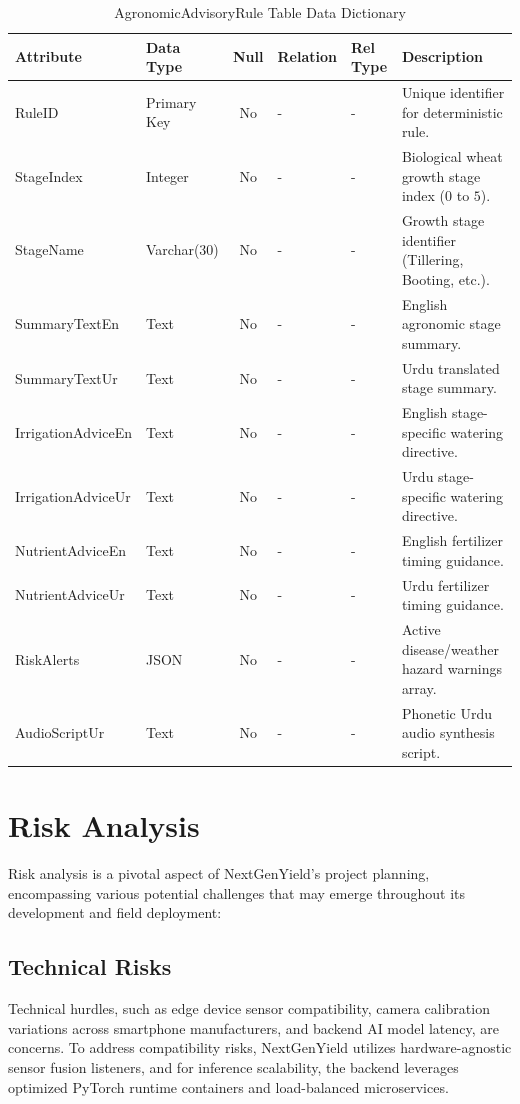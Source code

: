 \begin{table}[H]
\footnotesize
\centering
\caption{AgronomicAdvisoryRule Table Data Dictionary}
\label{tab:advisory_table}
\begin{tabular}{|l|l|c|l|l|p{4.5cm}|}
\hline
\textbf{Attribute} & \textbf{Data Type} & \textbf{Null} & \textbf{Relation} & \textbf{Rel Type} & \textbf{Description} \\ \hline
RuleID & Primary Key & No & - & - & Unique identifier for deterministic rule. \\ \hline
StageIndex & Integer & No & - & - & Biological wheat growth stage index ($0$ to $5$). \\ \hline
StageName & Varchar(30) & No & - & - & Growth stage identifier (Tillering, Booting, etc.). \\ \hline
SummaryTextEn & Text & No & - & - & English agronomic stage summary. \\ \hline
SummaryTextUr & Text & No & - & - & Urdu translated stage summary. \\ \hline
IrrigationAdviceEn & Text & No & - & - & English stage-specific watering directive. \\ \hline
IrrigationAdviceUr & Text & No & - & - & Urdu stage-specific watering directive. \\ \hline
NutrientAdviceEn & Text & No & - & - & English fertilizer timing guidance. \\ \hline
NutrientAdviceUr & Text & No & - & - & Urdu fertilizer timing guidance. \\ \hline
RiskAlerts & JSON & No & - & - & Active disease/weather hazard warnings array. \\ \hline
AudioScriptUr & Text & No & - & - & Phonetic Urdu audio synthesis script. \\ \hline
\end{tabular}
\end{table}

\clearpage
\section{Risk Analysis}
Risk analysis is a pivotal aspect of NextGenYield's project planning, encompassing various potential challenges that may emerge throughout its development and field deployment:

\subsection{Technical Risks}
Technical hurdles, such as edge device sensor compatibility, camera calibration variations across smartphone manufacturers, and backend AI model latency, are concerns. To address compatibility risks, NextGenYield utilizes hardware-agnostic sensor fusion listeners, and for inference scalability, the backend leverages optimized PyTorch runtime containers and load-balanced microservices.

